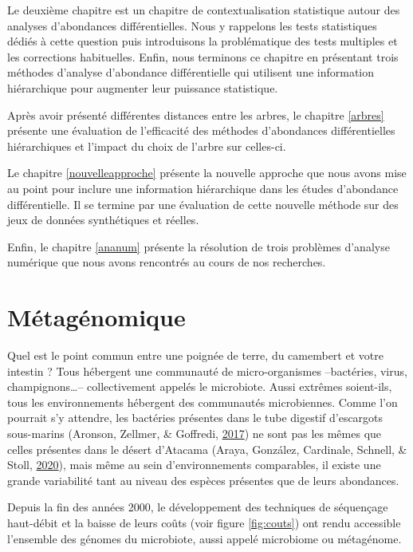 \documentclass[12pt,a4paper]{reedthesis}
\theoremstyle{definition}
\theoremstyle{definition}
\theoremstyle{definition}
\theoremstyle{remark}
\begin{document}
Le deuxième chapitre est un chapitre de contextualisation statistique autour des analyses d'abondances différentielles. Nous y rappelons les tests statistiques dédiés à cette question puis introduisons la problématique des tests multiples et les corrections habituelles. Enfin, nous terminons ce chapitre en présentant trois méthodes d'analyse d'abondance différentielle qui utilisent une information hiérarchique pour augmenter leur puissance statistique.

Après avoir présenté différentes distances entre les arbres, le chapitre \ref{arbres} présente une évaluation de l'efficacité des méthodes d'abondances différentielles hiérarchiques et l'impact du choix de l'arbre sur celles-ci.

Le chapitre \ref{nouvelleapproche} présente la nouvelle approche que nous avons mise au point pour inclure une information hiérarchique dans les études d'abondance différentielle. Il se termine par une évaluation de cette nouvelle méthode sur des jeux de données synthétiques et réelles.

Enfin, le chapitre \ref{ananum} présente la résolution de trois problèmes d'analyse numérique que nous avons rencontrés au cours de nos recherches.

\hypertarget{metagenomique}{%
\chapter{Métagénomique}\label{metagenomique}}

Quel est le point commun entre une poignée de terre, du camembert et votre intestin ? Tous hébergent une communauté de micro-organismes --bactéries, virus, champignons\ldots-- collectivement appelés le microbiote. Aussi extrêmes soient-ils, tous les environnements hébergent des communautés microbiennes. Comme l'on pourrait s'y attendre, les bactéries présentes dans le tube digestif d'escargots sous-marins (Aronson, Zellmer, \& Goffredi, \protect\hyperlink{ref-aronson2017specific}{2017}) ne sont pas les mêmes que celles présentes dans le désert d'Atacama (Araya, González, Cardinale, Schnell, \& Stoll, \protect\hyperlink{ref-araya2020microbiome}{2020}), mais même au sein d'environnements comparables, il existe une grande variabilité tant au niveau des espèces présentes que de leurs abondances.

Depuis la fin des années 2000, le développement des techniques de séquençage haut-débit et la baisse de leurs coûts (voir figure \ref{fig:couts}) ont rendu accessible l'ensemble des génomes du microbiote, aussi appelé microbiome ou métagénome.
\end{document}
